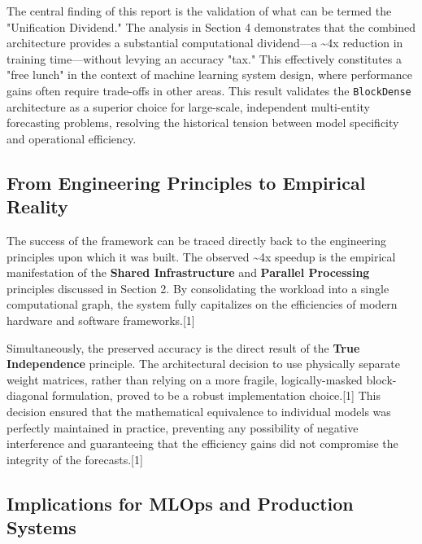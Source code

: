 \documentclass{article}
\begin{document}
The central finding of this report is the validation of what can be termed the "Unification Dividend." The analysis in Section 4 demonstrates that the combined architecture provides a substantial computational dividend—a \textasciitilde4x reduction in training time—without levying an accuracy "tax." This effectively constitutes a "free lunch" in the context of machine learning system design, where performance gains often require trade-offs in other areas. This result validates the \texttt{BlockDense} architecture as a superior choice for large-scale, independent multi-entity forecasting problems, resolving the historical tension between model specificity and operational efficiency.

\subsection{From Engineering Principles to Empirical Reality}

The success of the framework can be traced directly back to the engineering principles upon which it was built. The observed \textasciitilde4x speedup is the empirical manifestation of the \textbf{Shared Infrastructure} and \textbf{Parallel Processing} principles discussed in Section 2. By consolidating the workload into a single computational graph, the system fully capitalizes on the efficiencies of modern hardware and software frameworks.[1]

Simultaneously, the preserved accuracy is the direct result of the \textbf{True Independence} principle. The architectural decision to use physically separate weight matrices, rather than relying on a more fragile, logically-masked block-diagonal formulation, proved to be a robust implementation choice.[1] This decision ensured that the mathematical equivalence to individual models was perfectly maintained in practice, preventing any possibility of negative interference and guaranteeing that the efficiency gains did not compromise the integrity of the forecasts.[1]

\subsection{Implications for MLOps and Production Systems}
\end{document}
